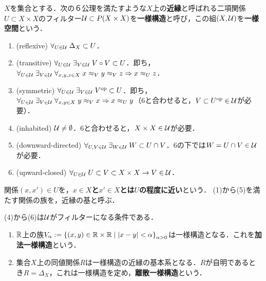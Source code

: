 \documentclass[uplatex,dvipdfmx]{jsreport}
\begin{document}
\begin{definition}
    $X$を集合とする．次の６公理を満たすような$X$上の\textbf{近縁}と呼ばれる二項関係$U\subset X\times X$のフィルター$\mathcal{U}\subset P(X\times X)$を\textbf{一様構造}と呼び，この組$(X,\mathcal{U})$を\textbf{一様空間}という．
    \begin{enumerate}
        \item (reflexive) $\forall_{U\in\mathcal{U}}\;\Delta_X\subset U$．
        \item (transitive) $\forall_{U\in\mathcal{U}}\;\exists_{V\in\mathcal{U}}\;V\circ V\subset U$．即ち，$\forall_{U\in\mathcal{U}}\;\exists_{V\in\mathcal{U}}\;\forall_{x,y,z\in X}\;x\approx_V y\approx_V z\Rightarrow x\approx_U z$．
        \item (symmetric) $\forall_{U\in\mathcal{U}}\;\exists_{V\in\mathcal{U}}\;V^{\mathrm{op}}\subset U$．即ち，$\forall_{U\in\mathcal{U}}\;\exists_{V\in\mathcal{U}}\;\forall_{x,y\in X}\;y\approx_V x\Rightarrow x\approx_Uy$（6と合わせると，$V\subset U^{\mathrm{op}}\in\mathcal{U}$が必要）．
        \item (inhabited) $\mathcal{U}\ne\emptyset$．6と合わせると，$X\times X\in\mathcal{U}$が必要．
        \item (downward-directed) $\forall_{U,V\in\mathcal{U}}\;\exists_{W\in\mathcal{U}}\;W\subset U\cap V$．6の下では$W=U\cap V\in\mathcal{U}$が必要．
        \item (upward-closed) $\forall_{U\in\mathcal{U}}\;U\subset V\subset X\times X\rightarrow V\in\mathcal{U}$．
    \end{enumerate}
    関係$(x,x')\in U$を，\textbf{$x\in X$と$x'\in X$とは$U$の程度に近い}という．
    (1)から(5)を満たす関係の族を，近縁の基と呼ぶ．
\end{definition}
\begin{remarks}
    (4)から(6)は$\mathcal{U}$がフィルターになる条件である．
\end{remarks}

\begin{example}[加法構造]\mbox{}
    \begin{enumerate}
        \item $\mathbb{R}$上の族$V_\alpha:=\left\{(x,y)\in\mathbb{R}\times\mathbb{R}\mid\lvert x-y\rvert<\alpha\right\}_{\alpha>0}$は一様構造となる．これを\textbf{加法一様構造}という．
        \item 集合$X$上の同値関係$R$は一様構造の近縁の基本系となる．$R$が自明であるとき$R=\Delta_X$，これは一様構造を定め，\textbf{離散一様構造}という．
    \end{enumerate}
\end{example}
\end{document}
